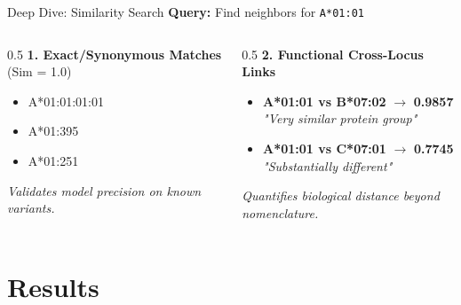 \documentclass[aspectratio=169]{beamer}
\begin{document}
\begin{frame}{Deep Dive: Similarity Search}
  \textbf{Query:} Find neighbors for \texttt{A*01:01}
  
  \vspace{0.3cm}
  
  \begin{columns}
    \begin{column}{0.5\textwidth}
      \textbf{1. Exact/Synonymous Matches} (Sim = 1.0)
      \begin{itemize}\scriptsize
        \item A*01:01:01:01
        \item A*01:395
        \item A*01:251
      \end{itemize}
      \vspace{0.2cm}
      \textit{Validates model precision on known variants.}
    \end{column}
    \begin{column}{0.5\textwidth}
      \textbf{2. Functional Cross-Locus Links}
      \begin{itemize}\scriptsize
        \item \textbf{A*01:01 vs B*07:02} $\rightarrow$ \textbf{0.9857} \\
        \textit{"Very similar protein group"}
        \item \textbf{A*01:01 vs C*07:01} $\rightarrow$ \textbf{0.7745} \\
        \textit{"Substantially different"}
      \end{itemize}
      \vspace{0.2cm}
      \textit{Quantifies biological distance beyond nomenclature.}
    \end{column}
  \end{columns}
\end{frame}

\section{Results}
\end{document}
